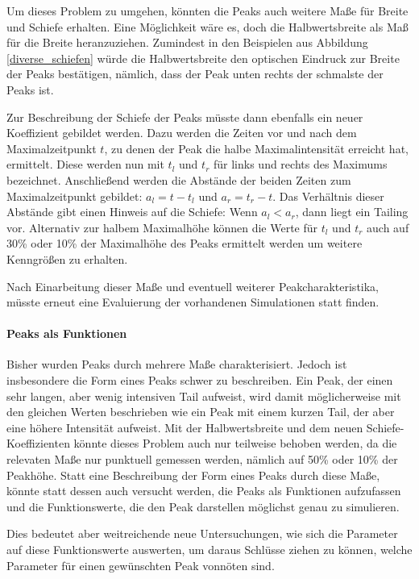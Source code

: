 Um dieses Problem zu umgehen, könnten die Peaks auch weitere Maße für Breite und Schiefe erhalten. Eine Möglichkeit wäre es, doch die Halbwertsbreite als Maß für die Breite heranzuziehen. Zumindest in den Beispielen aus Abbildung \ref{diverse_schiefen} würde die Halbwertsbreite den optischen Eindruck zur Breite der Peaks bestätigen, nämlich, dass der Peak unten rechts der schmalste der Peaks ist. 

Zur Beschreibung der Schiefe der Peaks müsste dann ebenfalls ein neuer Koeffizient gebildet werden. Dazu werden die Zeiten vor und nach dem Maximalzeitpunkt $t$, zu denen der Peak die halbe Maximalintensität erreicht hat, ermittelt. Diese werden nun mit $t_l$ und $t_r$ für links und rechts des Maximums bezeichnet. Anschließend werden die Abstände der beiden Zeiten zum Maximalzeitpunkt gebildet: $a_l = t-t_l$ und $a_r = t_r -t$. Das Verhältnis dieser Abstände gibt einen Hinweis auf die Schiefe: Wenn $a_l < a_r$, dann liegt ein Tailing vor.
Alternativ zur halbem Maximalhöhe können die Werte für $t_l$ und $t_r$ auch auf 30\% oder 10\% der Maximalhöhe des Peaks ermittelt werden um weitere Kenngrößen zu erhalten.

Nach Einarbeitung dieser Maße und eventuell weiterer Peakcharakteristika, müsste erneut eine Evaluierung der vorhandenen Simulationen statt finden. 

\paragraph{Peaks als Funktionen}
Bisher wurden Peaks durch mehrere Maße charakterisiert. Jedoch ist insbesondere die Form eines Peaks schwer zu beschreiben. Ein Peak, der einen sehr langen, aber wenig intensiven Tail aufweist, wird damit möglicherweise mit den gleichen Werten beschrieben wie ein Peak mit einem kurzen Tail, der aber eine höhere Intensität aufweist. Mit der Halbwertsbreite und dem neuen Schiefe-Koeffizienten könnte dieses Problem auch nur teilweise behoben werden, da die relevaten Maße nur punktuell gemessen werden, nämlich auf 50\% oder 10\% der Peakhöhe. Statt eine Beschreibung der Form eines Peaks durch diese Maße, könnte statt dessen auch versucht werden, die Peaks als Funktionen aufzufassen und die Funktionswerte, die den Peak darstellen möglichst genau zu simulieren. 

Dies bedeutet aber weitreichende neue Untersuchungen, wie sich die Parameter auf diese Funktionswerte auswerten, um daraus Schlüsse ziehen zu können, welche Parameter für einen gewünschten Peak vonnöten sind.


